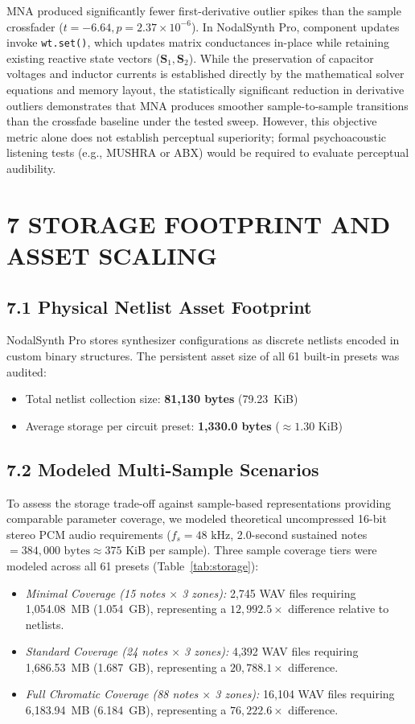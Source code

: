 \documentclass[fleqn,draft]{jaes}
\begin{document}
MNA produced significantly fewer first-derivative outlier spikes than the sample crossfader ($t = -6.64, p = 2.37 \times 10^{-6}$). In NodalSynth Pro, component updates invoke \texttt{wt.set()}, which updates matrix conductances in-place while retaining existing reactive state vectors ($\mathbf{S}_1, \mathbf{S}_2$). While the preservation of capacitor voltages and inductor currents is established directly by the mathematical solver equations and memory layout, the statistically significant reduction in derivative outliers demonstrates that MNA produces smoother sample-to-sample transitions than the crossfade baseline under the tested sweep. However, this objective metric alone does not establish perceptual superiority; formal psychoacoustic listening tests (e.g., MUSHRA or ABX) would be required to evaluate perceptual audibility.

\section{7 STORAGE FOOTPRINT AND ASSET SCALING}

\subsection{7.1 Physical Netlist Asset Footprint}
NodalSynth Pro stores synthesizer configurations as discrete netlists encoded in custom binary structures. The persistent asset size of all 61 built-in presets was audited:
\begin{itemize}
\item Total netlist collection size: \textbf{81,130 bytes} (79.23~KiB)
\item Average storage per circuit preset: \textbf{1,330.0 bytes} ($\approx 1.30\text{ KiB}$)
\end{itemize}

\subsection{7.2 Modeled Multi-Sample Scenarios}
To assess the storage trade-off against sample-based representations providing comparable parameter coverage, we modeled theoretical uncompressed 16-bit stereo PCM audio requirements ($f_s = 48\text{ kHz}$, 2.0-second sustained notes $= 384,000\text{ bytes} \approx 375\text{ KiB}$ per sample). Three sample coverage tiers were modeled across all 61 presets (Table~\ref{tab:storage}):
\begin{itemize}
\item \textit{Minimal Coverage (15 notes $\times$ 3 zones):} 2,745 WAV files requiring 1,054.08~MB (1.054~GB), representing a \textbf{$12,992.5\times$} difference relative to netlists.
\item \textit{Standard Coverage (24 notes $\times$ 3 zones):} 4,392 WAV files requiring 1,686.53~MB (1.687~GB), representing a \textbf{$20,788.1\times$} difference.
\item \textit{Full Chromatic Coverage (88 notes $\times$ 3 zones):} 16,104 WAV files requiring 6,183.94~MB (6.184~GB), representing a \textbf{$76,222.6\times$} difference.
\end{itemize}
\end{document}
